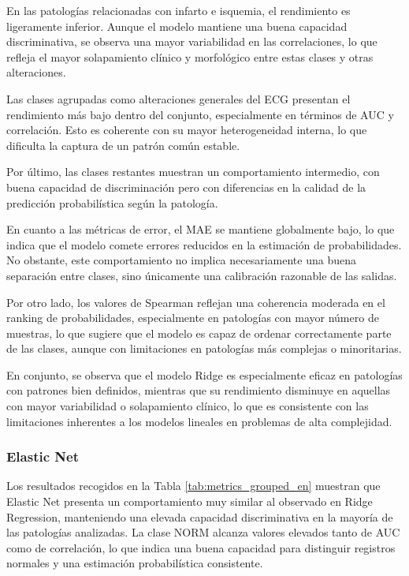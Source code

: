 \documentclass[12pt,a4paper,twoside]{book}
\begin{document}
En las patologías relacionadas con infarto e isquemia, el rendimiento es ligeramente inferior. 
Aunque el modelo mantiene una buena capacidad discriminativa, se observa una mayor variabilidad en las correlaciones, lo que refleja el mayor solapamiento clínico y morfológico entre estas clases y otras alteraciones.

Las clases agrupadas como alteraciones generales del ECG presentan el rendimiento más bajo dentro del conjunto, especialmente en términos de AUC y correlación. 
Esto es coherente con su mayor heterogeneidad interna, lo que dificulta la captura de un patrón común estable.

Por último, las clases restantes muestran un comportamiento intermedio, con buena capacidad de discriminación pero con diferencias en la calidad de la predicción probabilística según la patología.

En cuanto a las métricas de error, el MAE se mantiene globalmente bajo, lo que indica que el modelo comete errores reducidos en la estimación de probabilidades. 
No obstante, este comportamiento no implica necesariamente una buena separación entre clases, sino únicamente una calibración razonable de las salidas.

Por otro lado, los valores de Spearman reflejan una coherencia moderada en el ranking de probabilidades, especialmente en patologías con mayor número de muestras, lo que sugiere que el modelo es capaz de ordenar correctamente parte de las clases, aunque con limitaciones en patologías más complejas o minoritarias.

En conjunto, se observa que el modelo Ridge es especialmente eficaz en patologías con patrones bien definidos, mientras que su rendimiento disminuye en aquellas con mayor variabilidad o solapamiento clínico, lo que es consistente con las limitaciones inherentes a los modelos lineales en problemas de alta complejidad.

\subsubsection*{Elastic Net}

Los resultados recogidos en la Tabla \ref{tab:metrics_grouped_en} muestran que Elastic Net presenta un comportamiento muy similar al observado en Ridge Regression, manteniendo una elevada capacidad discriminativa en la mayoría de las patologías analizadas. 
La clase NORM alcanza valores elevados tanto de AUC como de correlación, lo que indica una buena capacidad para distinguir registros normales y una estimación probabilística consistente.
\end{document}
